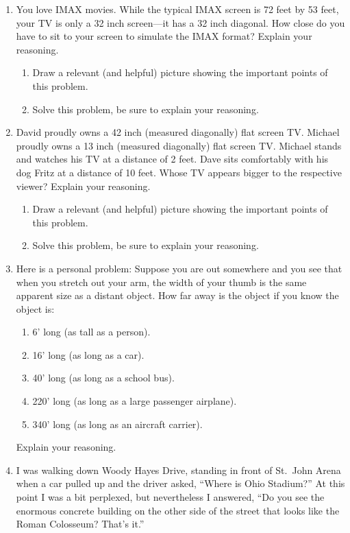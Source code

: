\begin{problems}
\begin{enumerate}
\item You love IMAX movies. While the typical IMAX screen is 72 feet
  by 53 feet, your TV is only a 32 inch screen---it has a 32 inch
  diagonal. How close do you have to sit to your screen to simulate
  the IMAX format? Explain your reasoning.
\begin{enumerate}
\item Draw a relevant (and helpful) picture showing the important
  points of this problem.
\item Solve this problem, be sure to explain your reasoning.
\end{enumerate}

\item David proudly owns a 42 inch (measured diagonally) flat screen
  TV. Michael proudly owns a 13 inch (measured diagonally) flat screen
  TV. Michael stands and watches his TV at a distance of 2 feet. Dave
  sits comfortably with his dog Fritz at a distance of 10 feet. Whose
  TV appears bigger to the respective viewer? Explain your reasoning.
\begin{enumerate}
\item Draw a relevant (and helpful) picture showing the important
  points of this problem.
\item Solve this problem, be sure to explain your reasoning.
\end{enumerate}

\item Here is a personal problem: Suppose you are out somewhere and
  you see that when you stretch out your arm, the width of your thumb
  is the same apparent size as a distant object. How far away is the
  object if you know the object is:
\begin{enumerate}
\item 6' long (as tall as a person).
\item 16' long (as long as a car).
\item 40' long (as long as a school bus).
\item 220' long (as long as a large passenger airplane).
\item 340' long (as long as an aircraft carrier).
\end{enumerate}
Explain your reasoning.

\item I was walking down Woody Hayes Drive, standing in front of
  St.\ John Arena when a car pulled up and the driver asked, ``Where
  is Ohio Stadium?'' At this point I was a bit perplexed, but
  nevertheless I answered, ``Do you see the enormous concrete building
  on the other side of the street that looks like the Roman Colosseum?
  That's it.''
 

\end{enumerate}
\end{problems}
